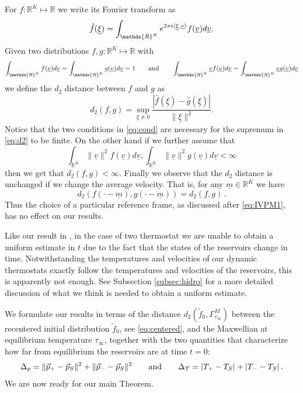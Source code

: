 \documentclass{article}
\newcommand*\R{ \mathds{R} }
\newcommand\uv{{\underline v}}
\newcommand\uxi{{\underline \xi}}
\DeclarePairedDelimiter{\scal}{\langle}{\rangle}
\begin{document}
For $f:\R^{K}\mapsto \R$ we write its Fourier transform as
\begin{equation*}
\hat f(\underline \xi)=\int_{\R^K}e^{2\pi i \scal{\underline \xi,\underline v}}f(\uv)d\uv.
\end{equation*}
%
Given two distributions $f,g:\R^{K}\mapsto \R$ with
%
\begin{equation}\label{eq:cond}
\int_{\R^K}f(\uv)d\uv=\int_{\R^K}g(\uv)d\uv=1
\qquad\hbox{and}\qquad 
\int_{\R^K}\uv f(\uv)d\uv=\int_{\R^K}\uv g(\uv)d\uv
\end{equation}
%
we define the $d_2$ distance between $f$ and $g$ as
%
\begin{equation}\label{eq:d2}
d_2(f,g)=\sup_{\uxi\not=0}\frac{|\hat f(\uxi)- \hat g(\uxi)|}{\|\uxi\|^2}.
\end{equation}
%
Notice that the two conditions in \eqref{eq:cond} are necessary for the supremum in \eqref{eq:d2} to be finite. On the 
other hand if we further assume that
\[
\int_{\R^K}\|\uv\|^2 f(\uv)d\uv,\int_{\R^K}\|\uv\|^2 g(\uv)d\uv<\infty
\]
then we get that $d_2(f,g)<\infty$. Finally we observe that the $d_2$ distance is unchanged if we change the average
velocity. That is, for any $\underline m\in \R^K$ we have %
\begin{equation}\label{eq:shift}
d_2(f(\cdot-\underline m), g(\cdot-\underline m))=d_2(f,g)\, .
\end{equation}
%
Thus the choice of a particular reference frame, as discussed after \eqref{eq:IVPM1}, has no effect on our results.

Like our result in \cite{BLP25}, in the case of two thermostat we are unable to obtain a uniform estimate in $t$ due to
the fact that the states of the reservoirs change in time. Notwithstanding the temperatures and velocities of our
dynamic thermostats exactly follow the temperatures and velocities of the reservoirs,  this is apparently not enough.
See Subsection \ref{subsec:hidro} for a more detailed discussion of what we think is needed to obtain a uniform
estimate.

We formulate our results in terms of the distance $d_2(\tilde f_0,\Gamma^M_{\tau_\infty})$ between the recentered
initial distribution $\tilde f_0$, see \eqref{eq:centered}, and the Maxwellian at equilibrium temperature $\tau_\infty$,
together with the two quantities that characterize how far from equilibrium the reservoirs are at time $t=0$:
\begin{equation}\label{eq:defp}
\Delta_p=\|\vec p_+-\vec p_S\|^2+\|\vec p_--\vec p_S\|^2\qquad\hbox{and}\qquad
\Delta_T=|T_+-T_S|+|T_--T_S|\, .
\end{equation}
We are now ready for our main Theorem.
\end{document}
